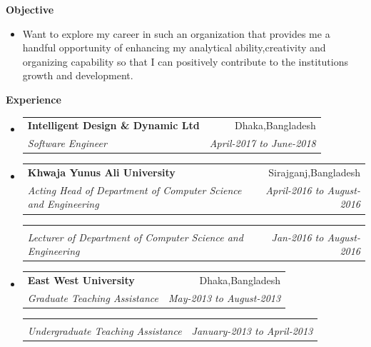 \documentclass[letterpaper,10pt]{article}
\makeatletter
\newcommand{\resitem}[1]{\item #1 \vspace{-2pt}}
\newcommand{\resheading}[1]{{\large \colorbox{mygrey}{\begin{minipage}{\textwidth}{\textbf{#1 \vphantom{p\^{E}}}}\end{minipage}}}}
\newcommand{\ressubheading}[4]{
\begin{tabular*}{6.5in}{l@{\extracolsep{\fill}}r}
		\textbf{#1} & #2 \\
		\textit{#3} & \textit{#4} \\
\end{tabular*}\vspace{-6pt}}
\makeatother
\begin{document}
\vspace{0.1in}

\resheading{Objective}
\begin{itemize}
\resitem{ \justify
 Want to explore my career in such an organization that provides me a handful opportunity of enhancing my analytical ability,creativity and organizing capability so that I can positively contribute to the institutions growth and development.


 }
\end{itemize}

\vspace{0.1in}
\resheading{Experience}
\begin{itemize}




\item

\ressubheading{Intelligent Design \& Dynamic Ltd}{Dhaka,Bangladesh}{Software Engineer}{April-2017 to June-2018}
\item
\ressubheading{Khwaja Yunus Ali University}{Sirajganj,Bangladesh}{Acting Head of Department of Computer Science and Engineering}{April-2016 to August-2016}
\ressubheading{ }{}{Lecturer of Department of Computer Science and Engineering}{Jan-2016 to August-2016 }
\item
	\ressubheading{East West University}{Dhaka,Bangladesh}{Graduate Teaching Assistance }{May-2013 to August-2013 }
\ressubheading{}{}{Undergraduate Teaching Assistance}{January-2013 to April-2013}	
\end{itemize}
\end{document}

